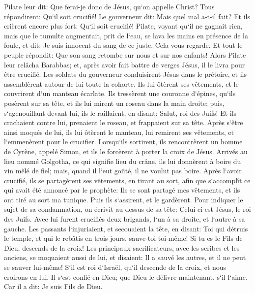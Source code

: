 \verse Pilate leur dit: Que ferai-je donc de Jésus, qu`on appelle Christ? Tous répondirent: Qu`il soit crucifié! 
\verse Le gouverneur dit: Mais quel mal a-t-il fait? Et ils crièrent encore plus fort: Qu`il soit crucifié! 
\verse Pilate, voyant qu`il ne gagnait rien, mais que le tumulte augmentait, prit de l`eau, se lava les mains en présence de la foule, et dit: Je suis innocent du sang de ce juste. Cela vous regarde. 
\verse Et tout le peuple répondit: Que son sang retombe sur nous et sur nos enfants! 
\verse Alors Pilate leur relâcha Barabbas; et, après avoir fait battre de verges Jésus, il le livra pour être crucifié. 
\verse Les soldats du gouverneur conduisirent Jésus dans le prétoire, et ils assemblèrent autour de lui toute la cohorte. 
\verse Ils lui ôtèrent ses vêtements, et le couvrirent d`un manteau écarlate. 
\verse Ils tressèrent une couronne d`épines, qu`ils posèrent sur sa tête, et ils lui mirent un roseau dans la main droite; puis, s`agenouillant devant lui, ils le raillaient, en disant: Salut, roi des Juifs! 
\verse Et ils crachaient contre lui, prenaient le roseau, et frappaient sur sa tête. 
\verse Après s`être ainsi moqués de lui, ils lui ôtèrent le manteau, lui remirent ses vêtements, et l`emmenèrent pour le crucifier. 
\verse Lorsqu`ils sortirent, ils rencontrèrent un homme de Cyrène, appelé Simon, et ils le forcèrent à porter la croix de Jésus. 
\verse Arrivés au lieu nommé Golgotha, ce qui signifie lieu du crâne, 
\verse ils lui donnèrent à boire du vin mêlé de fiel; mais, quand il l`eut goûté, il ne voulut pas boire. 
\verse Après l`avoir crucifié, ils se partagèrent ses vêtements, en tirant au sort, afin que s`accomplît ce qui avait été annoncé par le prophète: Ils se sont partagé mes vêtements, et ils ont tiré au sort ma tunique. 
\verse Puis ils s`assirent, et le gardèrent. 
\verse Pour indiquer le sujet de sa condamnation, on écrivit au-dessus de sa tête: Celui-ci est Jésus, le roi des Juifs. 
\verse Avec lui furent crucifiés deux brigands, l`un à sa droite, et l`autre à sa gauche. 
\verse Les passants l`injuriaient, et secouaient la tête, 
\verse en disant: Toi qui détruis le temple, et qui le rebâtis en trois jours, sauve-toi toi-même! Si tu es le Fils de Dieu, descends de la croix! 
\verse Les principaux sacrificateurs, avec les scribes et les anciens, se moquaient aussi de lui, et disaient: 
\verse Il a sauvé les autres, et il ne peut se sauver lui-même! S`il est roi d`Israël, qu`il descende de la croix, et nous croirons en lui. 
\verse Il s`est confié en Dieu; que Dieu le délivre maintenant, s`il l`aime. Car il a dit: Je suis Fils de Dieu. 
